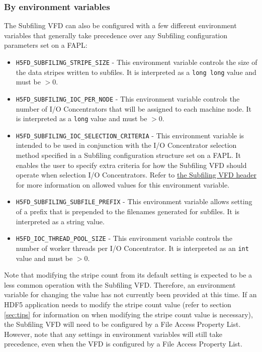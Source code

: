 \documentclass[../main.tex]{subfiles}
\begin{document}
\subsubsection{By environment variables}
\label{sec:envvars}

The Subfiling VFD can also be configured with a few different environment variables that
generally take precedence over any Subfiling configuration parameters set on a FAPL:

\begin{itemize}
\item \texttt{H5FD\_SUBFILING\_STRIPE\_SIZE} - This environment variable controls the size of
the data stripes written to subfiles. It is interpreted as a \texttt{long long} value and must
be $> 0$.

\item \texttt{H5FD\_SUBFILING\_IOC\_PER\_NODE} - This environment variable controls the number
of I/O Concentrators that will be assigned to each machine node. It is interpreted as a \texttt{long}
value and must be $> 0$.

\item \texttt{H5FD\_SUBFILING\_IOC\_SELECTION\_CRITERIA} - This environment variable is intended
to be used in conjunction with the I/O Concentrator selection method specified in a Subfiling
configuration structure set on a \Gls{FAPL}. It enables the user to specify extra criteria for
how the Subfiling VFD should operate when selection I/O Concentrators. Refer to
\href{https://github.com/HDFGroup/hdf5/blob/develop/src/H5FDsubfiling/H5FDsubfiling.h}{the Subfiling VFD header}
for more information on allowed values for this environment variable.

\item \texttt{H5FD\_SUBFILING\_SUBFILE\_PREFIX} - This environment variable allows setting of a
prefix that is prepended to the filenames generated for subfiles. It is interpreted as a string
value.

\item \texttt{H5FD\_IOC\_THREAD\_POOL\_SIZE} - This environment variable controls the number of
worker threads per I/O Concentrator. It is interpreted as an \texttt{int} value and must be $> 0$.
\end{itemize}

Note that modifying the stripe count from its default setting is expected to be a less common operation
with the Subfiling VFD. Therefore, an environment variable for changing the value has not currently
been provided at this time. If an HDF5 application needs to modify the stripe count value (refer to
section \ref{sec:tips} for information on when modifying the stripe count value is necessary), the
Subfiling VFD will need to be configured by a File Access Property List. However, note that any
settings in environment variables will still take precedence, even when the VFD is configured by
a File Access Property List.
\end{document}
